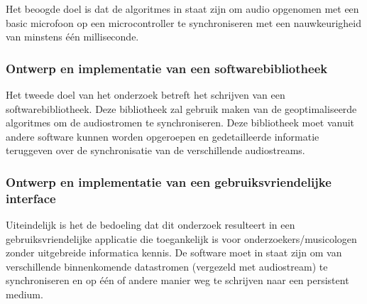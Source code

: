 Het beoogde doel is dat de algoritmes in staat zijn om audio opgenomen met een basic microfoon op een microcontroller te synchroniseren met een nauwkeurigheid van minstens één milliseconde.

\subsubsection{Ontwerp en implementatie van een softwarebibliotheek}
Het tweede doel van het onderzoek betreft het schrijven van een softwarebibliotheek. Deze bibliotheek zal gebruik maken van de geoptimaliseerde algoritmes om de audiostromen te synchroniseren. Deze bibliotheek moet vanuit andere software kunnen worden opgeroepen en gedetailleerde informatie teruggeven over de synchronisatie van de verschillende audiostreams.

\subsubsection{Ontwerp en implementatie van een gebruiksvriendelijke interface}

Uiteindelijk is het de bedoeling dat dit onderzoek resulteert in een gebruiksvriendelijke applicatie die toegankelijk is voor onderzoekers/musicologen zonder uitgebreide informatica kennis. De software moet in staat zijn om van verschillende binnenkomende datastromen (vergezeld met audiostream) te synchroniseren en op één of andere manier weg te schrijven naar een persistent medium.
